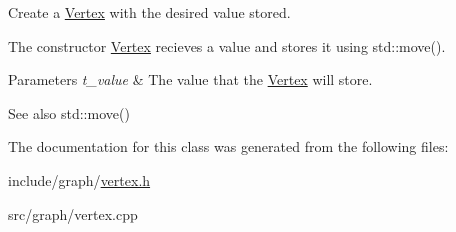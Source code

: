 Create a \hyperlink{classgnm_1_1_vertex}{Vertex} with the desired value stored. 

The constructor \hyperlink{classgnm_1_1_vertex}{Vertex} recieves a value and stores it using std\+::move().


\begin{DoxyParams}{Parameters}
{\em t\+\_\+value} & The value that the \hyperlink{classgnm_1_1_vertex}{Vertex} will store. \\
\hline
\end{DoxyParams}
\begin{DoxySeeAlso}{See also}
std\+::move() 
\end{DoxySeeAlso}


The documentation for this class was generated from the following files\+:\begin{DoxyCompactItemize}
\item 
include/graph/\hyperlink{vertex_8h}{vertex.\+h}\item 
src/graph/vertex.\+cpp\end{DoxyCompactItemize}
